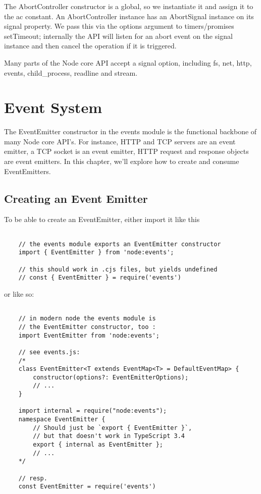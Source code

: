 \documentclass{scrartcl}
\begin{document}
The AbortController constructor is a global, so we instantiate it and assign it to the ac constant. An AbortController instance has an AbortSignal instance on its signal property. We pass this via the options argument to timers/promises setTimeout; internally the API will listen for an abort event on the signal instance and then cancel the operation if it is triggered.

Many parts of the Node core API accept a signal option, including fs, net, http, events, child\_process, readline and stream.

\section{Event System}

The EventEmitter constructor in the events module is the functional backbone of many Node core API's. For instance, HTTP and TCP servers are an event emitter, a TCP socket is an event emitter, HTTP request and response objects are event emitters. In this chapter, we'll explore how to create and consume EventEmitters.

\subsection{Creating an Event Emitter}

To be able to create an EventEmitter, either import it like this

\begin{lstlisting}[style=ES6]

    // the events module exports an EventEmitter constructor
    import { EventEmitter } from 'node:events';

    // this should work in .cjs files, but yields undefined
    // const { EventEmitter } = require('events')

\end{lstlisting}

or like so:

\begin{lstlisting}[style=ES6]

    // in modern node the events module is
    // the EventEmitter constructor, too :
    import EventEmitter from 'node:events';

    // see events.js:
    /*
    class EventEmitter<T extends EventMap<T> = DefaultEventMap> {
        constructor(options?: EventEmitterOptions);
        // ...
    }

    import internal = require("node:events");
    namespace EventEmitter {
        // Should just be `export { EventEmitter }`,
        // but that doesn't work in TypeScript 3.4
        export { internal as EventEmitter };
        // ...
    */

    // resp.
    const EventEmitter = require('events')

\end{lstlisting}
\end{document}
